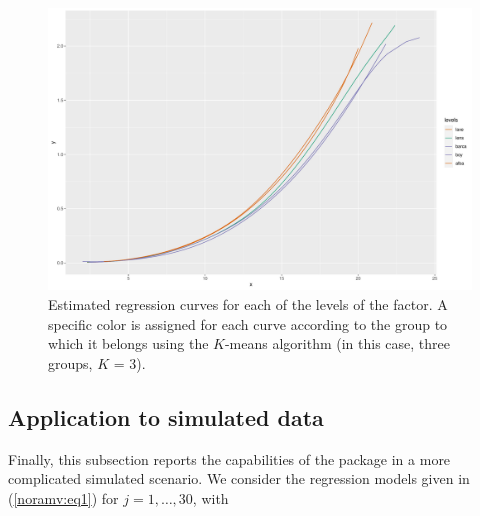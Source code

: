 \begin{figure}[htbp]
\includegraphics[width = 14cm]{barnacle5_kmeans.pdf}
\caption{\label{noramv:barnacle5kmeans}
Estimated regression curves for each of the levels of the factor. A specific color is assigned for each curve according to the group to which it belongs using the $K$-means algorithm (in this case, three groups, $K$ = 3).}
\end{figure}





\subsection{Application to simulated data}

Finally, this subsection reports the capabilities of the  package in a more complicated simulated scenario. We consider the regression models given in (\ref{noramv:eq1}) for $j=1, \ldots, 30$, with

